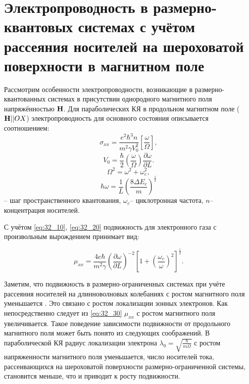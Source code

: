 \section{ Электропроводность в размерно-квантовых системах с учётом рассеяния носителей на шероховатой поверхности в магнитном поле}

Рассмотрим особенности электропроводности, возникающие в размерно-квантованных системах в присутствии однородного магнитного поля напряжённостью $\boldsymbol{\mathbf{H}}$. Для параболических КЯ в продольном магнитном поле ($\boldsymbol{\mathbf{H}} || OX$) электропроводность для основного состояния описывается соотношением:
\begin{equation} \label{eq:32_10}
\sigma _{xx} =\frac{e^{2} \hbar ^{3} n}{m^{2} \gamma V_{0}^{2} } \left[\frac{\omega }{\Omega } \right],
 \end{equation}
 \begin{equation} \label{eq:32_20}
 V_{0} =\frac{\hbar }{2} \left(\frac{\omega }{\Omega } \right)\frac{\partial \omega }{\partial L} .
 \end{equation}
\[
\Omega ^{2} =\omega ^{2} +\omega _{c}^{2},
\] 
\[
\hbar \omega =\frac{1}{L} \left(\frac{8\Delta E_{c} }{m} \right)^{\frac{1}{2} } 
\]
-- шаг пространственного квантования, $\omega _{c} $-- циклотронная частота, $n$-- концентрация носителей.

С учётом \eqref{eq:32_10}, \eqref{eq:32_20} подвижность для электронного газа с произвольным вырождением принимает вид:

\begin{equation} \label{eq:32_30}
\mu _{xx} =\frac{4e\hbar }{m^{2} \gamma } \left(\frac{\partial \omega }{\partial L} \right)^{-2} \left[1+\left(\frac{\omega _{c} }{\omega } \right)^{2} \right]^{\frac{1}{2} }.
\end{equation}

Заметим, что подвижность в размерно-ограниченных системах при учёте рассеяния носителей на длинноволновых колебаниях с ростом магнитного поля уменьшается \cite{Sinyavskii1998}. Это связано с ростом локализации зонных электронов. Как непосредственно следует из \eqref{eq:32_30} $\mu _{xx} $ с ростом магнитного поля увеличивается. Такое поведение зависимости подвижности от продольного магнитного поля может быть понято из следующих соображений. В параболической КЯ радиус локализации электрона $\lambda _{0} =\sqrt{\frac{\hbar }{m\Omega } } $ с ростом напряженности магнитного поля уменьшается, число носителей тока, рассеивающихся на шероховатой поверхности размерно-ограниченной системы, становится меньше, что и приводит к росту подвижности.


